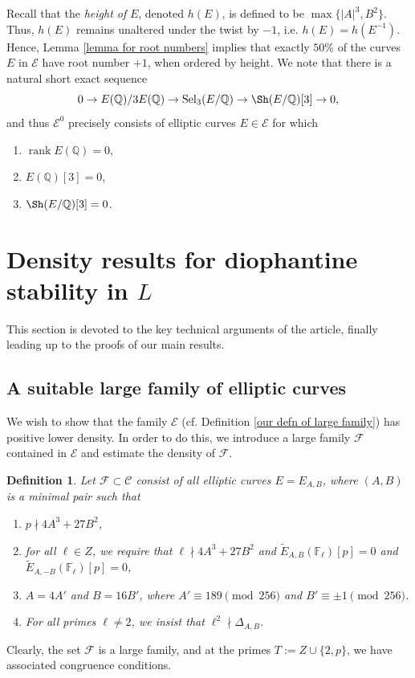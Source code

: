 \documentclass[12pt]{amsart}
\newtheorem{definition}[theorem]{Definition}
\newcommand{\cF}{\mathcal{F}}
\newcommand{\cE}{\mathcal{E}}
\newcommand{\Q}{\mathbb{Q}}
\newcommand{\F}{\mathbb{F}}
\newcommand{\cC}{\mathcal{C}}
\newcommand{\op}[1]{\operatorname{#1}}
\numberwithin{equation}{section}
\begin{document}
Recall that the \emph{height of} $E$, denoted $h(E)$, is defined to be $\op{max}\{|A|^3,B^2\}$. Thus, $h(E)$ remains unaltered under the twist by $-1$, i.e. $h(E)=h(E^{-1})$. Hence, Lemma \ref{lemma for root numbers} implies that exactly $50\%$ of the curves $E$ in $\cE$ have root number $+1$, when ordered by height. We note that there is a natural short exact sequence 
\[0\rightarrow E(\Q)/3 E(\Q)\rightarrow \op{Sel}_3(E/\Q)\rightarrow \Sh(E/\Q)[3]\rightarrow 0,\] and thus $\cE^0$ precisely consists of elliptic curves $E\in \cE$ for which 
\begin{enumerate}
    \item $\op{rank}E(\Q)=0$, 
    \item $E(\Q)[3]=0$, 
    \item $\Sh(E/\Q)[3]=0$. 
\end{enumerate}

\section{Density results for diophantine stability in $L$}\label{s 4}
\par This section is devoted to the key technical arguments of the article, finally leading up to the proofs of our main results.
\subsection{A suitable large family of elliptic curves}
\par We wish to show that the family $\cE$ (cf. Definition \ref{our defn of large family}) has positive lower density. In order to do this, we introduce a large family $\cF$ contained in $\cE$ and estimate the density of $\cF$. 

\begin{definition}
    Let $\cF\subset \cC$ consist of all elliptic curves $E=E_{A,B}$, where $(A,B)$ is a minimal pair such that 
    \begin{enumerate}
        \item $p\nmid 4A^3+27B^2$, 
        \item for all $\ell\in Z$, we require that $\ell\nmid 4A^3+27B^2$ and $\widetilde{E}_{A,B}(\F_\ell)[p]=0$ and $\widetilde{E}_{A,-B}(\F_\ell)[p]=0$, 
        \item $A=4A'$ and $B=16B'$, where $A' \equiv 189 \pmod{256}$ and $B' \equiv \pm 1 \pmod{256}$.
        \item For all primes $\ell\neq 2$, we insist that $\ell^2\nmid \Delta_{A,B}$.
    \end{enumerate}
\end{definition}
Clearly, the set $\cF$ is a large family, and at the primes $T:=Z\cup \{2, p\}$, we have associated congruence conditions. 
\end{document}
